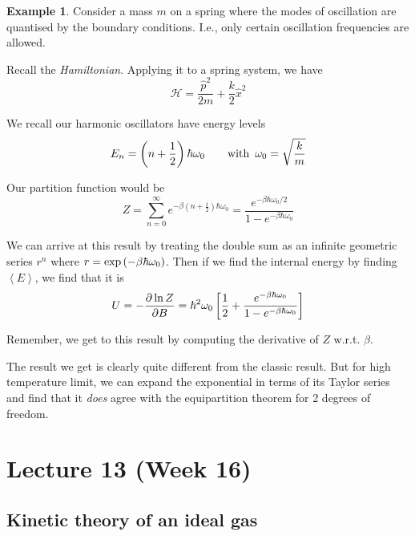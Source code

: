 \documentclass[12pt,chapterprefix=false,dvipsnames]{scrbook}
\theoremstyle{dotless}
\theoremstyle{definition}
\newtheorem{protoexample}{Example}[section]
\newenvironment{example}
{\colorlet{shadecolor}{red!15}\begin{shaded}\begin{protoexample}}
			{\end{protoexample}\end{shaded}}
\newcommand{\Hamiltonian}{\mathcal{H}}
\begin{document}
\begin{example}
	Consider a mass $m$ on a spring where the
	modes of oscillation are quantised by the boundary conditions.
	I.e., only certain oscillation frequencies are allowed.

	Recall the \textit{Hamiltonian}. Applying it to a spring
	system, we have
	\begin{equation}
		\Hamiltonian = \frac{ \hat{p}^2 }{2m} + \frac{k}{2}
		\hat{x}^2
	\end{equation}

	We recall our harmonic oscillators have energy levels
	\begin{equation}
		E_n = \left( n + \frac{1}{2}\right) \hbar \omega_0
		\hspace{2em} \mathrm{with}
		\hspace{.5em} \omega_0 = \sqrt{\frac{k}{m}}
	\end{equation}

	Our partition function would be
	\begin{equation}
		Z = \sum_{n=0}^\infty e^{-\beta\left(n + \frac{1}{2} \right)\hbar\omega_0} =
		\frac{e^{-\beta\hbar\omega_0/2}}{1 - e^{-\beta\hbar\omega_0}}
	\end{equation}

	We can arrive at this result by treating the double sum as an
	infinite geometric series $r^n$ where
	$r = \exponential{\left(-\beta\hbar\omega_0\right)}$.  Then if we find the internal energy by
	finding $\left<E\right>$, we find that it is
	\begin{equation}
        U = -\pdv{\naturallogarithm{Z}}{B} = \hbar^{2}\omega_0
		\left[\frac{1}{2} +
		\frac{e^{-\beta\hbar\omega_0}}{1-e^{-\beta\hbar\omega_0}}
		\right]
	\end{equation}

	Remember, we get to this result by computing the derivative of
	$Z$ w.r.t. $\beta$.

	The result we get is clearly quite different from the classic
	result. But for high temperature limit, we can expand the
	exponential in terms of its Taylor series and find that it
	\textit{does} agree with the equipartition theorem for
	2 degrees of freedom.
\end{example}

\chapter{Lecture 13 (Week 16)}%
\label{cha:lecture_13}

\section{Kinetic theory of an ideal gas}%
\label{sec:kinetic_theory_of_an_ideal_gas}
\end{document}
